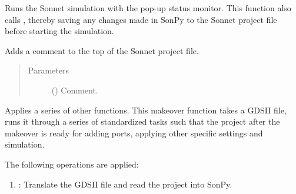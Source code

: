 \documentclass[letterpaper,10pt,english,openany]{sphinxmanual}
\begin{document}
\begin{fulllineitems}
\begin{fulllineitems}
\end{fulllineitems}


\begin{fulllineitems}
\label{\detokenize{source/sonpy:sonpy.sonnet.runSimulationStatusMonitor}}
Runs the Sonnet simulation with the pop-up status monitor. This function also calls {\hyperref[\detokenize{source/sonpy:sonpy.sonnet.printProject}]{}}, thereby saving any changes made in SonPy to the Sonnet project file before starting the simulation.

\end{fulllineitems}


\begin{fulllineitems}
\label{\detokenize{source/sonpy:sonpy.sonnet.addComment}}
Adds a comment to the top of the Sonnet project file.
\begin{quote}\begin{description}
\item[{Parameters}] \leavevmode
{} () \textendash{} Comment.

\end{description}\end{quote}

\end{fulllineitems}


\begin{fulllineitems}
\label{\detokenize{source/sonpy:sonpy.sonnet.runMakeover}}
Applies a series of other functions. This makeover function takes a GDSII file, runs it through a series of standardized tasks such that the project after the makeover is ready for adding ports, applying other specific settings and simulation.

The following operations are applied:
\begin{enumerate}
\item {} 
{\hyperref[\detokenize{source/sonpy:sonpy.sonnet.runGdsTranslator}]{}}: Translate the GDSII file and read the project into SonPy.


\end{enumerate}
\end{fulllineitems}
\end{fulllineitems}
\end{document}

